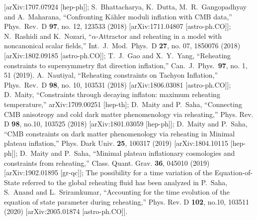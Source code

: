 \documentclass[%
aps,prd,nofootinbib,showkeys,a4paper,10pt
]{revtex4-2}
\begin{document}
\begin{thebibliography}{10}
[arXiv:1707.07924 [hep-ph]];
S.~Bhattacharya, K.~Dutta, M.~R.~Gangopadhyay and A.~Maharana,
``Confronting Kähler moduli inflation with CMB data,''
Phys.\ Rev.\ D {\bf 97}, no. 12, 123533 (2018)
[arXiv:1711.04807 [astro-ph.CO]];
N.~Rashidi and K.~Nozari,
``$\alpha$-Attractor and reheating in a model with noncanonical scalar fields,''
Int.\ J.\ Mod.\ Phys.\ D {\bf 27}, no. 07, 1850076 (2018)
[arXiv:1802.09185 [astro-ph.CO]];
T.~J.~Gao and X.~Y.~Yang,
``Reheating constraints to supersymmetry flat direction inflation,''
Can.\ J.\ Phys.\  {\bf 97}, no. 1, 51 (2019).
A.~Nautiyal,
``Reheating constraints on Tachyon Inflation,''
Phys.\ Rev.\ D {\bf 98}, no. 10, 103531 (2018)
[arXiv:1806.03081 [astro-ph.CO]];
D.~Maity,
``Constraints through decaying inflaton: maximum reheating temperature,''
arXiv:1709.00251 [hep-th];
D.~Maity and P.~Saha,
``Connecting CMB anisotropy and cold dark matter phenomenology via reheating,''
Phys. Rev. D \textbf{98}, no.10, 103525 (2018)
[arXiv:1801.03059 [hep-ph]];
D.~Maity and P.~Saha,
``CMB constraints on dark matter phenomenology via reheating in Minimal plateau inflation,''
Phys. Dark Univ. \textbf{25}, 100317 (2019)
[arXiv:1804.10115 [hep-ph]];
D.~Maity and P.~Saha,
``Minimal plateau inflationary cosmologies and constraints from reheating,''
Class. Quant. Grav. \textbf{36}, 045010 (2019)
[arXiv:1902.01895 [gr-qc]];
The possibility for a time variation of the Equation-of-State referred to the global reheating fluid has been analyzed in 
P.~Saha, S.~Anand and L.~Sriramkumar,
``Accounting for the time evolution of the equation of state parameter during reheating,''
Phys. Rev. D \textbf{102}, no.10, 103511 (2020)
[arXiv:2005.01874 [astro-ph.CO]].



\end{thebibliography}
\end{document}
